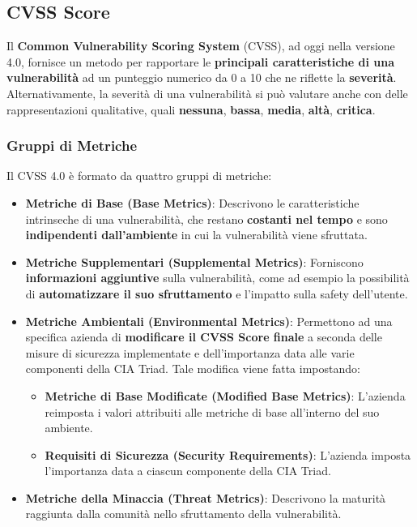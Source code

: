 \documentclass{article}
\begin{document}
\subsection{CVSS Score}
Il \textbf{Common Vulnerability Scoring System} (CVSS), ad oggi nella versione 4.0, fornisce un metodo per rapportare le \textbf{principali caratteristiche di una vulnerabilità} ad un punteggio numerico da 0 a 10 che ne riflette la \textbf{severità}. \\
Alternativamente, la severità di una vulnerabilità si può valutare anche con delle rappresentazioni qualitative, quali \textbf{nessuna}, \textbf{bassa}, \textbf{media}, \textbf{altà}, \textbf{critica}.

\subsubsection{Gruppi di Metriche}
Il CVSS 4.0 è formato da quattro gruppi di metriche:
\begin{itemize}
	\item \textbf{Metriche di Base (Base Metrics)}: Descrivono le caratteristiche intrinseche di una vulnerabilità, che restano \textbf{costanti nel tempo} e sono \textbf{indipendenti dall’ambiente} in cui la vulnerabilità viene sfruttata. 
	
	\item \textbf{Metriche Supplementari (Supplemental Metrics)}: Forniscono \textbf{informazioni aggiuntive} sulla vulnerabilità, come ad esempio la possibilità di \textbf{automatizzare il suo sfruttamento} e l’impatto sulla safety dell’utente.
	
	\item \textbf{Metriche Ambientali (Environmental Metrics)}: Permettono ad una specifica azienda di \textbf{modificare il CVSS Score finale} a seconda delle misure di sicurezza implementate e dell’importanza data alle varie componenti della CIA Triad. Tale modifica viene fatta impostando:
	\begin{itemize}
		\item \textbf{Metriche di Base Modificate (Modified Base Metrics)}:
		L’azienda reimposta i valori attribuiti alle metriche di base all’interno del suo ambiente.
		
		\item \textbf{Requisiti di Sicurezza (Security Requirements)}: L'azienda imposta l’importanza data a ciascun componente della CIA Triad.
	\end{itemize}
	
	\item \textbf{Metriche della Minaccia (Threat Metrics)}: Descrivono la maturità raggiunta dalla comunità nello sfruttamento della vulnerabilità.
\end{itemize}
\end{document}
